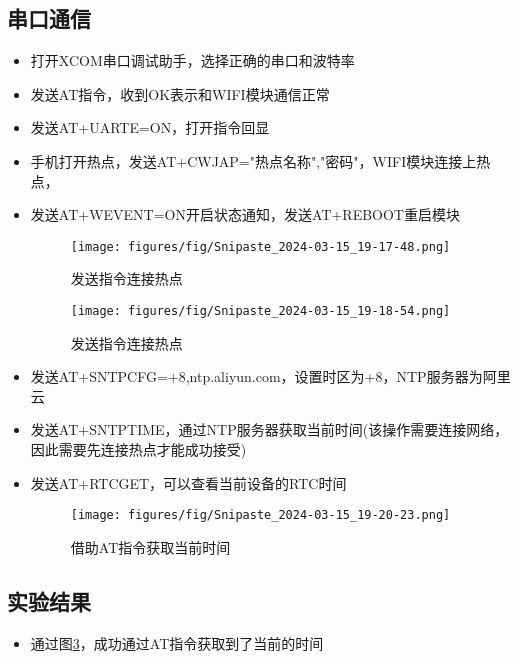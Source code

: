\documentclass[12pt,hyperref,a4paper,UTF8]{ctexart}
\begin{document}
    \subsection*{串口通信}
\begin{itemize}[itemsep=-5pt, topsep=0pt, partopsep=0pt]
    \item 打开XCOM串口调试助手，选择正确的串口和波特率
    \item 发送AT指令，收到OK表示和WIFI模块通信正常
    \item 发送AT+UARTE=ON，打开指令回显
    \item 手机打开热点，发送AT+CWJAP="热点名称","密码"，WIFI模块连接上热点，
    \item 发送AT+WEVENT=ON开启状态通知，发送AT+REBOOT重启模块
    \begin{figure}[H]
        \centering
        \texttt{[image: figures/fig/Snipaste\_2024-03-15\_19-17-48.png]}
        \caption{发送指令连接热点}
        \label{fig:enter-label}
    \end{figure}    
    \begin{figure}[H]
        \centering
        \texttt{[image: figures/fig/Snipaste\_2024-03-15\_19-18-54.png]}
        \caption{发送指令连接热点}
        \label{fig:enter-label}
    \end{figure} 
    
    \item 发送AT+SNTPCFG=+8,ntp.aliyun.com，设置时区为+8，NTP服务器为阿里云
    \item 发送AT+SNTPTIME，通过NTP服务器获取当前时间(该操作需要连接网络，因此需要先连接热点才能成功接受)
    \item 发送AT+RTCGET，可以查看当前设备的RTC时间
    \begin{figure}[H]
        \centering
        \texttt{[image: figures/fig/Snipaste\_2024-03-15\_19-20-23.png]}
        \caption{借助AT指令获取当前时间}
        \label{fig:6}
    \end{figure}  

  
\end{itemize}




\subsection{实验结果}
\begin{itemize}
    \item 通过图\ref{fig:6}，成功通过AT指令获取到了当前的时间
\end{itemize}
\end{document}
